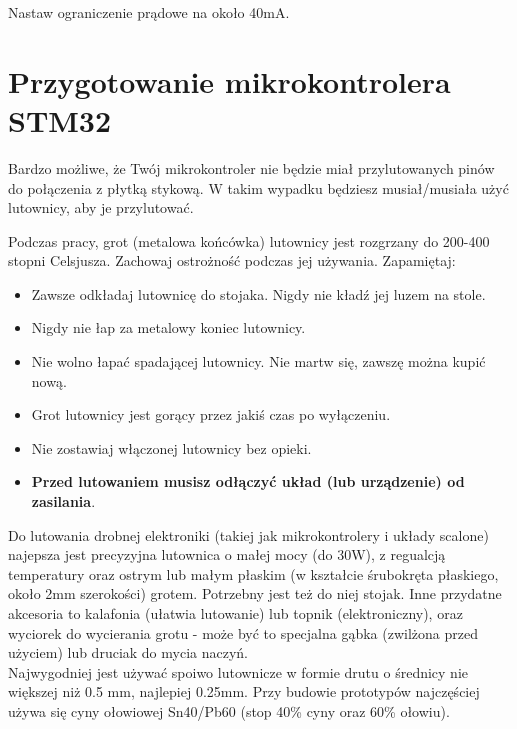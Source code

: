 \documentclass{pdfBooklets}
\begin{document}
Nastaw ograniczenie prądowe na około 40mA.


\section{Przygotowanie mikrokontrolera STM32}

Bardzo możliwe, że Twój mikrokontroler nie będzie miał przylutowanych pinów do połączenia z płytką stykową.
W takim wypadku będziesz musiał/musiała użyć lutownicy, aby je przylutować.\\

\begin{ProTip}{}
  Podczas pracy, grot (metalowa końcówka) lutownicy jest rozgrzany do 200-400 stopni Celsjusza. Zachowaj ostrożność
  podczas jej używania. Zapamiętaj:
  \begin{itemize}
  \item Zawsze odkładaj lutownicę do stojaka. Nigdy nie kładź jej luzem na stole.
  \item Nigdy nie łap za metalowy koniec lutownicy.
  \item Nie wolno łapać spadającej lutownicy. Nie martw się, zawszę można kupić nową.
  \item Grot lutownicy jest gorący przez jakiś czas po wyłączeniu.
  \item Nie zostawiaj włączonej lutownicy bez opieki.
  \item \textbf{Przed lutowaniem musisz odłączyć układ (lub urządzenie) od zasilania}.
  \end{itemize}
\end{ProTip}

Do lutowania drobnej elektroniki (takiej jak mikrokontrolery i układy scalone) najepsza jest precyzyjna lutownica o małej mocy (do 30W),
z regualcją temperatury oraz ostrym lub małym płaskim (w kształcie śrubokręta płaskiego, około 2mm szerokości) grotem. Potrzebny jest też do niej
stojak. Inne przydatne akcesoria to kalafonia (ułatwia lutowanie) lub topnik (elektroniczny), oraz wyciorek do wycierania grotu - może być to specjalna gąbka (zwilżona
przed użyciem) lub druciak do mycia naczyń.\\

Najwygodniej jest używać spoiwo lutownicze w formie drutu o średnicy nie większej niż 0.5 mm, najlepiej 0.25mm. Przy budowie prototypów
najczęściej używa się cyny ołowiowej Sn40/Pb60 (stop 40\% cyny oraz 60\% ołowiu).
\\
\end{document}
